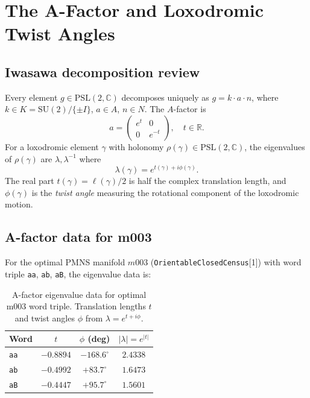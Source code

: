 \documentclass[epjc3]{svjour3}
\newcommand{\PSL}{\mathrm{PSL}(2,\mathbb{C})}
\newcommand{\SUtwo}{\mathrm{SU}(2)}
\begin{document}
\section{The A-Factor and Loxodromic Twist Angles}
\label{sec:afactor}

\subsection{Iwasawa decomposition review}

Every element $g \in \PSL$ decomposes uniquely as $g = k \cdot a \cdot n$,
where $k \in K = \SUtwo/\{\pm I\}$, $a \in A$, $n \in N$.
The $A$-factor is
\begin{equation}
a = \begin{pmatrix} e^t & 0 \\ 0 & e^{-t} \end{pmatrix}, \quad t \in \mathbb{R}.
\end{equation}
For a loxodromic element $\gamma$ with holonomy $\rho(\gamma) \in \PSL$,
the eigenvalues of $\rho(\gamma)$ are $\lambda, \lambda^{-1}$ where
\begin{equation}
\lambda(\gamma) = e^{t(\gamma) + i\phi(\gamma)}.
\label{eq:eigenvalue}
\end{equation}
The real part $t(\gamma) = \ell(\gamma)/2$ is half the complex
translation length, and $\phi(\gamma)$ is the \emph{twist angle}
measuring the rotational component of the loxodromic motion.

\subsection{A-factor data for m003}

For the optimal PMNS manifold $m003$
(\texttt{OrientableClosedCensus}[1]) with word triple
\texttt{aa}, \texttt{ab}, \texttt{aB}, the eigenvalue data is:

\begin{table}[h]
\centering
\caption{A-factor eigenvalue data for optimal m003 word triple.
Translation lengths $t$ and twist angles $\phi$ from
$\lambda = e^{t+i\phi}$.}
\label{tab:afactor}
\begin{tabular}{lccc}
\toprule
Word & $t$ & $\phi$ (deg) & $|\lambda| = e^{|t|}$ \\
\midrule
\texttt{aa} & $-0.8894$ & $-168.6^\circ$ & $2.4338$ \\
\texttt{ab} & $-0.4992$ & $+83.7^\circ$ & $1.6473$ \\
\texttt{aB} & $-0.4447$ & $+95.7^\circ$ & $1.5601$ \\
\bottomrule
\end{tabular}
\end{table}
\end{document}
